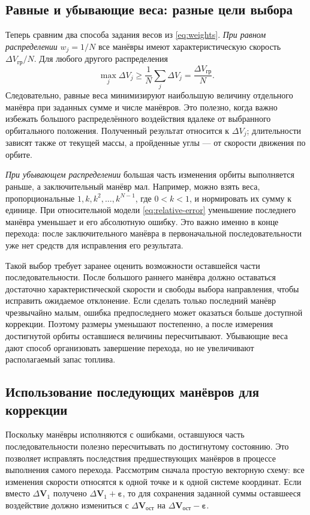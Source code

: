 \documentclass[a4paper,11pt]{article}
\newcommand{\vect}[1]{\boldsymbol{#1}}
\numberwithin{equation}{section}
\begin{document}
\subsection{Равные и убывающие веса: разные цели выбора}

Теперь сравним два способа задания весов из \eqref{eq:weights}.
\textit{При равном распределении} $w_j=1/N$ все манёвры имеют
характеристическую скорость $\Delta V_{\text{гр}}/N$.
Для любого другого распределения
\begin{equation}
\max_j\Delta V_j\geqslant
\frac{1}{N}\sum_j\Delta V_j=
\frac{\Delta V_{\text{гр}}}{N}.
\label{eq:equal-minmax}
\end{equation}
Следовательно, равные веса минимизируют наибольшую величину
отдельного манёвра при заданных сумме и числе манёвров.
Это полезно, когда важно избежать большого распределённого воздействия
вдалеке от выбранного орбитального положения. Полученный результат
относится к $\Delta V_j$; длительности зависят также от текущей массы,
а пройденные углы --- от скорости движения по орбите.

\textit{При убывающем распределении} большая часть изменения орбиты
выполняется раньше, а заключительный манёвр мал.
Например, можно взять веса, пропорциональные
$1,k,k^2,\ldots,k^{N-1}$, где $0<k<1$, и нормировать их сумму к единице.
При относительной модели \eqref{eq:relative-error} уменьшение
последнего манёвра уменьшает и его абсолютную ошибку.
Это важно именно в конце перехода: после заключительного манёвра
в первоначальной последовательности уже нет средств для исправления
его результата.

Такой выбор требует заранее оценить возможности оставшейся части
последовательности. После большого раннего манёвра должно оставаться
достаточно характеристической скорости и свободы выбора направления,
чтобы исправить ожидаемое отклонение. Если сделать только последний
манёвр чрезвычайно малым, ошибка предпоследнего может оказаться
больше доступной коррекции. Поэтому размеры уменьшают постепенно,
а после измерения достигнутой орбиты оставшиеся величины пересчитывают.
Убывающие веса дают способ организовать завершение перехода,
но не увеличивают располагаемый запас топлива.

\subsection{Использование последующих манёвров для коррекции}

Поскольку манёвры исполняются с ошибками, оставшуюся часть
последовательности полезно пересчитывать по достигнутому состоянию.
Это позволяет исправлять последствия предшествующих манёвров
в процессе выполнения самого перехода.
Рассмотрим сначала простую векторную схему: все изменения скорости
относятся к одной точке и к одной системе координат.
Если вместо $\Delta\vect V_1$ получено
$\Delta\vect V_1+\vect\varepsilon$, то для сохранения заданной
суммы оставшееся воздействие должно измениться с
$\Delta\vect V_{\text{ост}}$ на
$\Delta\vect V_{\text{ост}}-\vect\varepsilon$.
\end{document}
